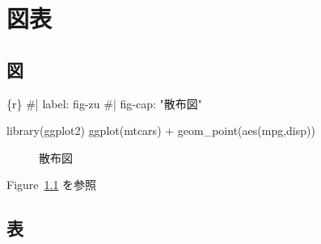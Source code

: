 \documentclass[
  b5paper,
  xelatex, ja=standard]{bxjsbook}
\newenvironment{Shaded}{\begin{snugshade}}{\end{snugshade}}
\newcommand{\InformationTok}[1]{\textcolor[rgb]{0.37,0.37,0.37}{#1}}
\begin{document}

\chapter{図表}\label{sec-caution}

\section{図}\label{ux56f3}

\begin{Shaded}
\begin{Highlighting}[]
\InformationTok{\textasciigrave{}\textasciigrave{}\textasciigrave{}\{r\}}
\InformationTok{\#| label: fig{-}zu}
\InformationTok{\#| fig{-}cap: "散布図"}

\InformationTok{library(ggplot2)}
\InformationTok{ggplot(mtcars) +}
\InformationTok{  geom\_point(aes(mpg,disp))}
\InformationTok{\textasciigrave{}\textasciigrave{}\textasciigrave{}}
\end{Highlighting}
\end{Shaded}

\begin{figure}[H]


\caption{\label{fig-zu}散布図}

\end{figure}%

Figure~\ref{fig-zu} を参照

\section{表}\label{ux8868}
\end{document}
